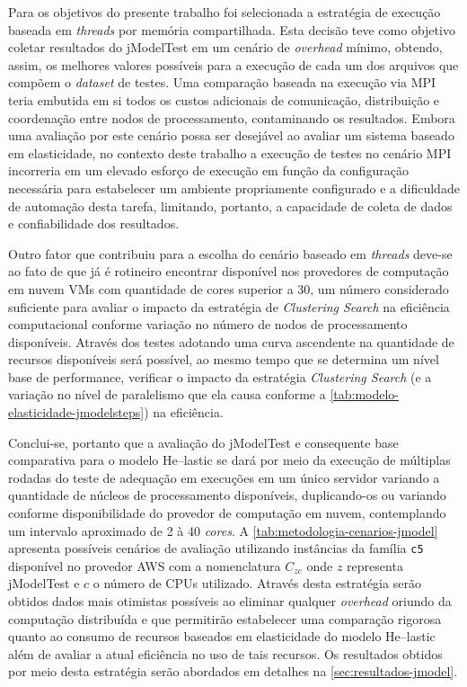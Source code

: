 \documentclass[english,brazilian]{UNISINOSmonografia} %
\begin{document}
Para os objetivos do presente trabalho foi selecionada a estratégia de execução baseada em \textit{threads} por memória compartilhada.
Esta decisão teve como objetivo coletar resultados do jModelTest em um cenário de \textit{overhead} mínimo, obtendo, assim, os melhores valores possíveis para a execução de cada um dos arquivos que compõem o \textit{dataset} de testes.
Uma comparação baseada na execução via MPI teria embutida em si todos os custos adicionais de comunicação, distribuição e coordenação entre nodos de processamento, contaminando os resultados.
Embora uma avaliação por este cenário possa ser desejável ao avaliar um sistema baseado em elasticidade, no contexto deste trabalho a execução de testes no cenário MPI incorreria em um elevado esforço de execução em função da configuração necessária para estabelecer um ambiente propriamente configurado e a dificuldade de automação desta tarefa, limitando, portanto, a capacidade de coleta de dados e confiabilidade dos resultados.


Outro fator que contribuiu para a escolha do cenário baseado em \textit{threads} deve-se ao fato de que já é rotineiro encontrar disponível nos provedores de computação em nuvem VMs com quantidade de cores superior a 30, um número considerado suficiente para avaliar o impacto da estratégia de \textit{Clustering Search} na eficiência computacional conforme variação no número de nodos de processamento disponíveis.
Através dos testes adotando uma curva ascendente na quantidade de recursos disponíveis será possível, ao mesmo tempo que se determina um nível base de performance, verificar o impacto da estratégia \textit{Clustering Search} (e a variação no nível de paralelismo que ela causa conforme a \autoref{tab:modelo-elasticidade-jmodelsteps}) na eficiência.


Conclui-se, portanto que a avaliação do jModelTest e consequente base comparativa para o modelo \textsf{He}--lastic se dará por meio da execução de múltiplas rodadas do teste de adequação em execuções em um único servidor variando a quantidade de núcleos de processamento disponíveis, duplicando-os ou variando conforme disponibilidade do provedor de computação em nuvem, contemplando um intervalo aproximado de 2 à 40 \textit{cores}.
A \autoref{tab:metodologia-cenarios-jmodel} apresenta possíveis cenários de avaliação utilizando instâncias da família \texttt{c5} disponível no provedor AWS com a nomenclatura $C_{zc}$ onde $z$ representa jModelTest e $c$ o número de CPUs utilizado.
Através desta estratégia serão obtidos dados mais otimistas possíveis ao eliminar qualquer \textit{overhead} oriundo da computação distribuída e que permitirão estabelecer uma comparação rigorosa quanto ao consumo de recursos baseados em elasticidade do modelo \textsf{He}--lastic além de avaliar a atual eficiência no uso de tais recursos.
Os resultados obtidos por meio desta estratégia serão abordados em detalhes na \autoref{sec:resultados-jmodel}.
\end{document}
